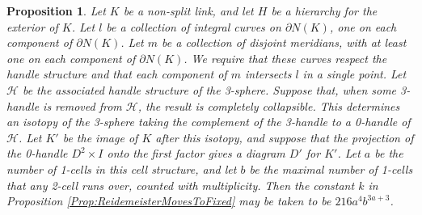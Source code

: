 \documentclass[oneside]{amsart}
\numberwithin{equation}{section}
\theoremstyle{plain}
\newtheorem{proposition}[equation]{Proposition}
\theoremstyle{definition}
\newcommand{\calH}{\mathcal{H}}
\begin{document}
\begin{proposition}
\label{Prop:CollapsibleHierarchy}
Let $K$ be a non-split link, and let $H$ be a hierarchy
for the exterior of $K$. Let $l$ be a collection of integral curves on $\partial N(K)$,
one on each component of $\partial N(K)$. Let $m$ be a collection of disjoint meridians,
with at least one on each component of $\partial N(K)$. We require that these curves
respect the handle structure and that each component
of $m$ intersects $l$ in a single point.
Let $\calH$ be the associated handle structure of the 3-sphere.
Suppose that, when some 3-handle is removed from $\calH$, the result
is completely collapsible. This determines an isotopy of the 3-sphere
taking the complement of the 3-handle to a 0-handle of $\mathcal{H}$.
Let $K'$ be the image of $K$ after this isotopy, and suppose that the projection of
the 0-handle $D^2 \times I$ onto the first factor gives a diagram $D'$
for $K'$. Let $a$ be the number of 1-cells in this cell structure, and
let $b$ be the maximal number of 1-cells that any 2-cell runs over, counted with multiplicity.
Then the constant $k$ in Proposition \ref{Prop:ReidemeisterMovesToFixed} may be taken to be $216a^4b^{3a+3}$.
\end{proposition}
\end{document}
